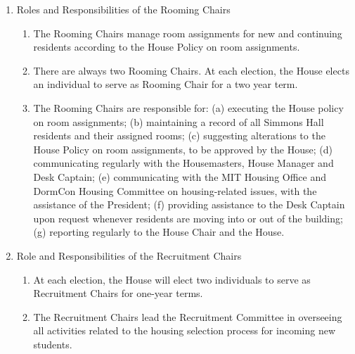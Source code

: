 \documentclass[letterpaper]{article}
\begin{document}
\begin{enumerate}
\begin{enumerate}
\begin{enumerate}
\end{enumerate}

\item Roles and Responsibilities of the Rooming Chairs

\begin{enumerate}

\item The Rooming Chairs manage room assignments for new and continuing residents according to the House Policy on room assignments.

\item There are always two Rooming Chairs. At each election, the House elects an individual to serve as Rooming Chair for a two year term.

\item The Rooming Chairs are responsible for: (a) executing the House policy on room assignments; (b) maintaining a record of all Simmons Hall residents and their assigned rooms; (c) suggesting alterations to the House Policy on room assignments, to be approved by the House; (d) communicating regularly with the Housemasters, House Manager and Desk Captain; (e) communicating with the MIT Housing Office and DormCon Housing Committee on housing-related issues, with the assistance of the President; (f) providing assistance to the Desk Captain upon request whenever residents are moving into or out of the building; (g) reporting regularly to the House Chair and the House.

\end{enumerate}

\item Role and Responsibilities of the Recruitment Chairs

\begin{enumerate}

\item At each election, the House will elect two individuals to serve as Recruitment Chairs for one-year terms.

\item The Recruitment Chairs lead the Recruitment Committee in overseeing all activities related to the housing selection process for incoming new students.


\end{enumerate}
\end{enumerate}
\end{enumerate}
\end{document}
